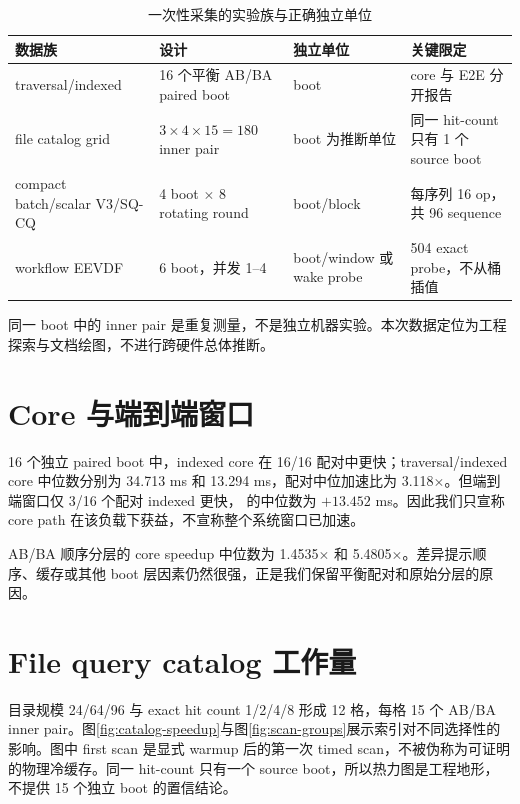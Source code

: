 \begin{table}[htbp]
  \centering
  \caption{一次性采集的实验族与正确独立单位}
  \label{tab:one-shot-families}
  \begin{tabularx}{\textwidth}{L{3.0cm}L{4.0cm}L{3.2cm}Y}
    \toprule
    数据族 & 设计 & 独立单位 & 关键限定 \\
    \midrule
    traversal/indexed & 16 个平衡 AB/BA paired boot & boot & core 与 E2E 分开报告 \\
    file catalog grid & $3\times4\times15=180$ inner pair & boot 为推断单位 & 同一 hit-count 只有 1 个 source boot \\
    compact batch/scalar V3/SQ-CQ & 4 boot $\times$ 8 rotating round & boot/block & 每序列 16 op，共 96 sequence \\
    workflow EEVDF & 6 boot，并发 1--4 & boot/window 或 wake probe & 504 exact probe，不从桶插值 \\
    \bottomrule
  \end{tabularx}
\end{table}

同一 boot 中的 inner pair 是重复测量，不是独立机器实验。本次数据定位为工程探索与文档绘图，不进行跨硬件总体推断。

\section{Core 与端到端窗口}

16 个独立 paired boot 中，indexed core 在 16/16 配对中更快；traversal/indexed core 中位数分别为 34.713 ms 和 13.294 ms，配对中位加速比为 3.118$\times$。但端到端窗口仅 3/16 个配对 indexed 更快， 的中位数为 $+13.452$ ms。因此我们只宣称 core path 在该负载下获益，不宣称整个系统窗口已加速。

AB/BA 顺序分层的 core speedup 中位数为 1.4535$\times$ 和 5.4805$\times$。差异提示顺序、缓存或其他 boot 层因素仍然很强，正是我们保留平衡配对和原始分层的原因。

\section{File query catalog 工作量}

目录规模 24/64/96 与 exact hit count 1/2/4/8 形成 12 格，每格 15 个 AB/BA inner pair。图\ref{fig:catalog-speedup}与图\ref{fig:scan-groups}展示索引对不同选择性的影响。图中 first scan 是显式 warmup 后的第一次 timed scan，不被伪称为可证明的物理冷缓存。同一 hit-count 只有一个 source boot，所以热力图是工程地形，不提供 15 个独立 boot 的置信结论。

